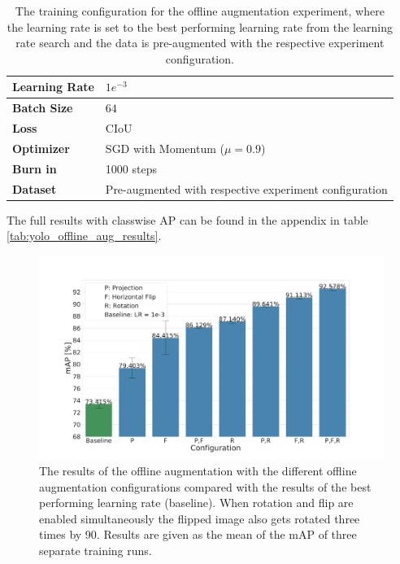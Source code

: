 \begin{table}[H]
\footnotesize
\begin{center}
\begin{tabular}{|l|l|}

\hline
\textbf{Learning Rate} & $1e^{-3}$ \\
\hline
\textbf{Batch Size} & $64$\\
\hline
\textbf{Loss} & CIoU \\
\hline
\textbf{Optimizer} & SGD with Momentum ($\mu = 0.9$)\\
\hline
\textbf{Burn in} & 1000 steps \\
\hline
\textbf{Dataset} & Pre-augmented with respective experiment configuration \\
\hline

\end{tabular}
\caption{The training configuration for the offline augmentation experiment, where the learning rate is set to the best performing learning rate from the learning rate search and the data is pre-augmented with the respective experiment configuration.}
\label{tab:yolo_offline_aug_config}
\end{center}
\end{table}

The full results with classwise \ac{AP} can be found in the appendix in table \ref{tab:yolo_offline_aug_results}.
\begin{figure}
\begin{center}
    \includegraphics[width=13cm]{imgs/yolo_offline_aug_experiment.pdf}
    \caption{The results of the offline augmentation with the different offline augmentation configurations compared with the results of the best performing learning rate (baseline). When rotation and flip are enabled simultaneously the flipped image also gets rotated three times by 90\textdegree. Results are given as the mean of the mAP of three separate training runs.}
    \label{fig:yolo_offline_aug_results}
\end{center}
\end{figure}

